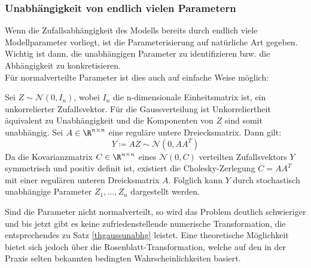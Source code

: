 \subsubsection{Unabhängigkeit von endlich vielen Parametern}
Wenn die Zufallsabhängigkeit des Modells bereits durch endlich viele Modellparameter vorliegt, ist die Parameterisierung auf natürliche Art gegeben. Wichtig ist dann, die unabhängigen Parameter zu identifizieren bzw. die Abhängigkeit zu konkretisieren.\\
Für normalverteilte Parameter ist dies auch auf einfache Weise möglich:
\begin{maththeorem}
\label{thgaussunabhg}
Sei $Z\sim\mathcal{N}(0,I_n)$, wobei $I_n$ die n-dimensionale Einheitsmatrix ist, ein unkorrelierter Zufallsvektor. Für die Gaussverteilung ist Unkorreliertheit äquivalent zu Unabhängigkeit und die Komponenten von $Z$ sind somit unabhängig. Sei $A\in\R^{n\times n}$ eine reguläre untere Dreiecksmatrix. Dann gilt:
\[Y\coloneqq AZ\sim\mathcal{N}(0,AA^T)\]
Da die Kovarianzmatrix $C\in\R^{n\times n}$ eines $\mathcal{N}(0,C)$ verteilten Zufallsvektors $Y$ symmetrisch und positiv definit ist, existiert die Cholesky-Zerlegung $C=AA^T$ mit einer regulären unteren Dreicksmatrix $A$. Folglich kann $Y$ durch stochastisch unabhängige Parameter $Z_1,\dots,Z_n$ dargestellt werden.
\end{maththeorem}
Sind die Parameter nicht normalverteilt, so wird das Problem deutlich schwieriger und bis jetzt gibt es keine zufriedenstellende numerische Transformation, die entsprechendes zu Satz \ref{thgaussunabhg} leistet. Eine theoretische Möglichkeit bietet sich jedoch über die Rosenblatt-Transformation, welche auf den in der Praxis selten bekannten bedingten Wahrscheinlichkeiten basiert.

